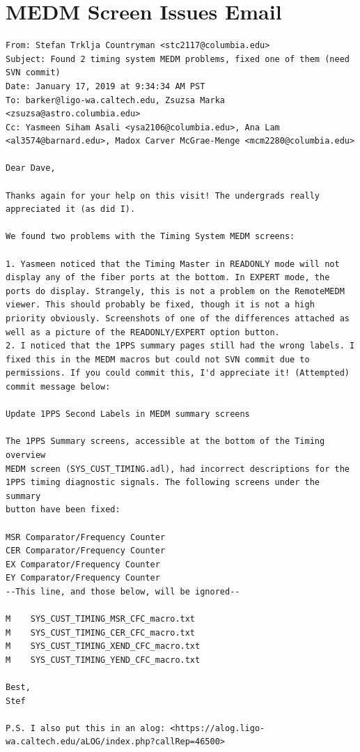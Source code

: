 \documentclass{article}
\begin{document}
\section{MEDM Screen Issues Email}
\label{sec:medm-email}
\lstset{language=}
\begin{lstlisting}
From: Stefan Trklja Countryman <stc2117@columbia.edu>
Subject: Found 2 timing system MEDM problems, fixed one of them (need SVN commit)
Date: January 17, 2019 at 9:34:34 AM PST
To: barker@ligo-wa.caltech.edu, Zsuzsa Marka <zsuzsa@astro.columbia.edu>
Cc: Yasmeen Siham Asali <ysa2106@columbia.edu>, Ana Lam <al3574@barnard.edu>, Madox Carver McGrae-Menge <mcm2280@columbia.edu>

Dear Dave,

Thanks again for your help on this visit! The undergrads really appreciated it (as did I).

We found two problems with the Timing System MEDM screens:

1. Yasmeen noticed that the Timing Master in READONLY mode will not display any of the fiber ports at the bottom. In EXPERT mode, the ports do display. Strangely, this is not a problem on the RemoteMEDM viewer. This should probably be fixed, though it is not a high priority obviously. Screenshots of one of the differences attached as well as a picture of the READONLY/EXPERT option button.
2. I noticed that the 1PPS summary pages still had the wrong labels. I fixed this in the MEDM macros but could not SVN commit due to permissions. If you could commit this, I'd appreciate it! (Attempted) commit message below:

Update 1PPS Second Labels in MEDM summary screens

The 1PPS Summary screens, accessible at the bottom of the Timing overview
MEDM screen (SYS_CUST_TIMING.adl), had incorrect descriptions for the
1PPS timing diagnostic signals. The following screens under the summary
button have been fixed:

MSR Comparator/Frequency Counter
CER Comparator/Frequency Counter
EX Comparator/Frequency Counter
EY Comparator/Frequency Counter
--This line, and those below, will be ignored--

M    SYS_CUST_TIMING_MSR_CFC_macro.txt
M    SYS_CUST_TIMING_CER_CFC_macro.txt
M    SYS_CUST_TIMING_XEND_CFC_macro.txt
M    SYS_CUST_TIMING_YEND_CFC_macro.txt

Best,
Stef

P.S. I also put this in an alog: <https://alog.ligo-wa.caltech.edu/aLOG/index.php?callRep=46500>
\end{lstlisting}
\end{document}
